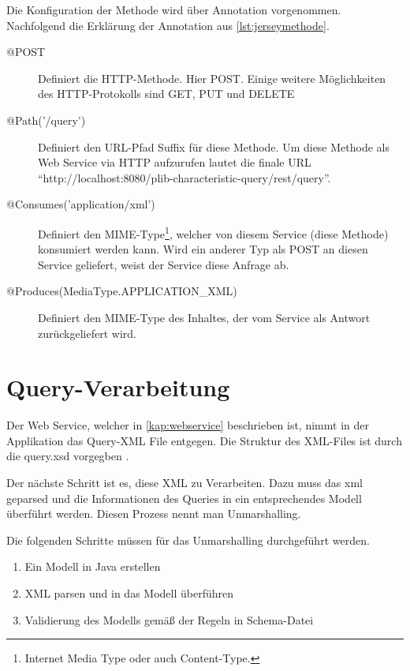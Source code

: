 Die Konfiguration der Methode wird über \Gls{Annotation} vorgenommen. Nachfolgend die Erklärung der \Gls{Annotation} aus \autoref{lst:jerseymethode}.

\begin{description}
\item[@POST] Definiert die \gls{HTTP-Methode}. Hier POST. Einige weitere Möglichkeiten des HTTP-Protokolls sind GET, PUT und DELETE
\item[@Path('/query')] Definiert den URL-Pfad Suffix für diese Methode. Um diese Methode als Web Service via HTTP aufzurufen lautet die finale URL \enquote{http://localhost:8080/plib-characteristic-query/rest/query}. 
\item[@Consumes('application/xml')] Definiert den \gls{MIME-Type}\footnote{Internet Media Type oder auch Content-Type.}, welcher von diesem Service (diese Methode) konsumiert werden kann. Wird ein anderer Typ als POST an diesen Service geliefert, weist der Service diese Anfrage ab. 
\item[@Produces(MediaType.APPLICATION\_XML)] Definiert den \gls{MIME-Type} des Inhaltes, der vom Service als Antwort zurückgeliefert wird.  
\end{description}

% 
\section{Query-Verarbeitung}

Der \gls{Web Service}, welcher in \autoref{kap:webservice} beschrieben ist, nimmt in der Applikation das Query-XML File entgegen. 
Die Struktur des XML-Files ist durch die query.xsd vorgegben \citep[27]{iso29002-31}. 

Der nächste Schritt ist es, diese XML zu Verarbeiten. Dazu muss das xml geparsed und die Informationen des Queries in ein entsprechendes Modell überführt werden. Diesen Prozess nennt man \gls{Unmarshalling}. 

Die folgenden Schritte müssen für das Unmarshalling durchgeführt werden.

\begin{enumerate}
\item Ein Modell in Java erstellen
\item XML parsen und in das Modell überführen
\item Validierung des Modells gemäß der Regeln in Schema-Datei
\end{enumerate}

